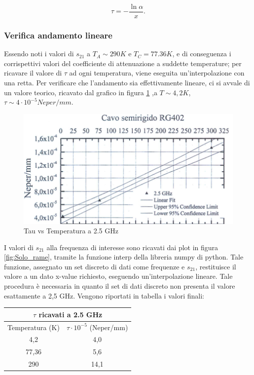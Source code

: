\begin{equation}
    \tau=-\frac{\ln{\alpha}}{x}.
\end{equation}

\subsubsection{Verifica andamento lineare}
\label{ssec:Verifica andamento lineare}
Essendo noti i valori di $s_{21}$ a $ T_{A}\sim290K $ e $ T_{C} = 77.36K $, e di conseguenza i corrispettivi valori del coefficiente di attenuazione a suddette temperature; per ricavare il valore di $ \tau $ ad ogni temperatura, viene eseguita un'interpolazione con una retta. Per verificare che l'andamento sia effettivamente lineare, ci si avvale di un valore teorico, ricavato dal grafico in figura \ref{fig:Tre_punti} ,a $ T \sim4,2K $,  $ \tau \sim 4\cdot  10^{-5}  Neper/mm$.

\begin{figure}[H]
	\centering
	\includegraphics[scale=0.8]{Tre_punti.png}
	\caption{Tau vs Temperatura a 2.5 GHz}
    	\label{fig:Tre_punti}
\end{figure}

I valori di $s_{21}$ alla frequenza di interesse sono ricavati dai plot in figura \ref{fig:Solo_rame},  tramite la funzione interp della libreria numpy di python. Tale funzione, assegnato un set discreto di dati come frequenze e $s_{21}$, restituisce il valore a un dato x-value richiesto, eseguendo un'interpolazione lineare. Tale procedura è necessaria in quanto il set di dati discreto non presenta il valore esattamente a 2,5 GHz. Vengono riportati in tabella i valori finali:

\begin{table}[h!]
\centering

\begin{tabular}{ |c|c|  }
	\hline
	\multicolumn{2}{|c|}{$\tau $ ricavati a 2.5 GHz} \\
	\hline
	Temperatura (K)& $\tau\cdot  10^{-5}$ (Neper/mm) \\
	\hline
	4,2   &  4,0   \\
	77,36  & 5,6 \\
	290 &14,1 \\
	\hline
\end{tabular}

\end{table}


